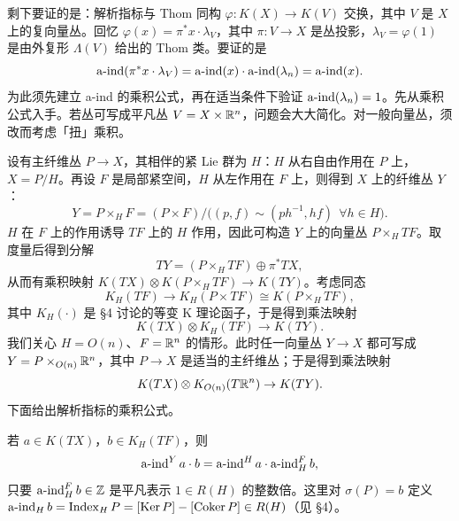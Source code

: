 
剩下要证的是：解析指标与 Thom 同构 $\varphi:K(X)\to K(V)$ 交换，其中 $V$ 是 $X$ 上的复向量丛。回忆 $\varphi(x)=\pi^*x\cdot\lambda_V$，其中 $\pi:V\to X$ 是丛投影，$\lambda_V=\varphi(1)$ 是由外复形 $\Lambda(V)$ 给出的 Thom 类。要证的是
\[
\operatorname{a\text{-}ind}(\pi^*x\cdot\lambda_V)=\operatorname{a\text{-}ind}(x)\cdot\operatorname{a\text{-}ind}(\lambda_n)=\operatorname{a\text{-}ind}(x).
\]
为此须先建立 a-ind 的乘积公式，再在适当条件下验证 $\operatorname{a\text{-}ind}(\lambda_n)=1$。先从乘积公式入手。若丛可写成平凡丛 $V=X\times\mathbb{R}^n$，问题会大大简化。对一般向量丛，须改而考虑「扭」乘积。

设有主纤维丛 $P\to X$，其相伴的紧 Lie 群为 $H$：$H$ 从右自由作用在 $P$ 上，$X=P/H$。再设 $F$ 是局部紧空间，$H$ 从左作用在 $F$ 上，则得到 $X$ 上的纤维丛 $Y$：
\[
Y=P\times_H F=(P\times F)\big/\big((p,f)\sim(ph^{-1},hf)\ \ \forall h\in H\big).
\]
$H$ 在 $F$ 上的作用诱导 $TF$ 上的 $H$ 作用，因此可构造 $Y$ 上的向量丛 $P\times_H TF$。取度量后得到分解
\[
TY=(P\times_H TF)\oplus\pi^*TX,
\]
从而有乘积映射 $K(TX)\otimes K(P\times_H TF)\to K(TY)$。考虑同态
\[
K_H(TF)\to K_H(P\times TF)\cong K(P\times_H TF),
\]
其中 $K_H(\cdot)$ 是 §4 讨论的等变 K 理论函子，于是得到乘法映射
\[
K(TX)\otimes K_H(TF)\to K(TY).
\]
我们关心 $H=O(n)$、$F=\mathbb{R}^n$ 的情形。此时任一向量丛 $Y\to X$ 都可写成 $Y=P\times_{O(n)}\mathbb{R}^n$，其中 $P\to X$ 是适当的主纤维丛；于是得到乘法映射
\[
K(TX)\otimes K_{O(n)}(T\mathbb{R}^n)\to K(TY).
\]
下面给出解析指标的乘积公式。

\begin{proposition}[乘性公理]
若 $a\in K(TX)$，$b\in K_H(TF)$，则
\[
\operatorname{a\text{-}ind}^Y a\cdot b=\operatorname{a\text{-}ind}^H a\cdot\operatorname{a\text{-}ind}_H^F b,
\]
只要 $\operatorname{a\text{-}ind}_H^F b\in\mathbb{Z}$ 是平凡表示 $1\in R(H)$ 的整数倍。这里对 $\sigma(P)=b$ 定义 $\operatorname{a\text{-}ind}_H b=\operatorname{Index}_H P=[\operatorname{Ker} P]-[\operatorname{Coker} P]\in R(H)$（见 §4）。
\end{proposition}


